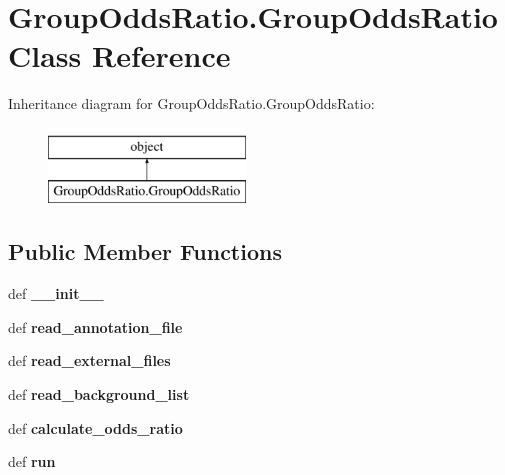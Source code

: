 \hypertarget{classGroupOddsRatio_1_1GroupOddsRatio}{\section{Group\-Odds\-Ratio.\-Group\-Odds\-Ratio Class Reference}
\label{classGroupOddsRatio_1_1GroupOddsRatio}
}
Inheritance diagram for Group\-Odds\-Ratio.\-Group\-Odds\-Ratio\-:\begin{figure}[H]
\begin{center}
\leavevmode
\includegraphics[height=2.000000cm]{classGroupOddsRatio_1_1GroupOddsRatio}
\end{center}
\end{figure}
\subsection*{Public Member Functions}
\begin{DoxyCompactItemize}
\item 
\hypertarget{classGroupOddsRatio_1_1GroupOddsRatio_aec69e18faa9a51522959f3dd9d5e538a}{def {\bfseries \-\_\-\-\_\-init\-\_\-\-\_\-}}\label{classGroupOddsRatio_1_1GroupOddsRatio_aec69e18faa9a51522959f3dd9d5e538a}

\item 
\hypertarget{classGroupOddsRatio_1_1GroupOddsRatio_ae1c6859406f05f270493ddc544b2bd53}{def {\bfseries read\-\_\-annotation\-\_\-file}}\label{classGroupOddsRatio_1_1GroupOddsRatio_ae1c6859406f05f270493ddc544b2bd53}

\item 
\hypertarget{classGroupOddsRatio_1_1GroupOddsRatio_af8a83aca2f1e4cff694e7eff001f4aee}{def {\bfseries read\-\_\-external\-\_\-files}}\label{classGroupOddsRatio_1_1GroupOddsRatio_af8a83aca2f1e4cff694e7eff001f4aee}

\item 
\hypertarget{classGroupOddsRatio_1_1GroupOddsRatio_a28c9307316b82a27b0899909e95ef0b0}{def {\bfseries read\-\_\-background\-\_\-list}}\label{classGroupOddsRatio_1_1GroupOddsRatio_a28c9307316b82a27b0899909e95ef0b0}

\item 
\hypertarget{classGroupOddsRatio_1_1GroupOddsRatio_aa060f2c1b8b606d7dc814251b254060a}{def {\bfseries calculate\-\_\-odds\-\_\-ratio}}\label{classGroupOddsRatio_1_1GroupOddsRatio_aa060f2c1b8b606d7dc814251b254060a}

\item 
\hypertarget{classGroupOddsRatio_1_1GroupOddsRatio_ad9d7e1b0c5e90275c88a074c7cb40b95}{def {\bfseries run}}\label{classGroupOddsRatio_1_1GroupOddsRatio_ad9d7e1b0c5e90275c88a074c7cb40b95}

\end{DoxyCompactItemize}
